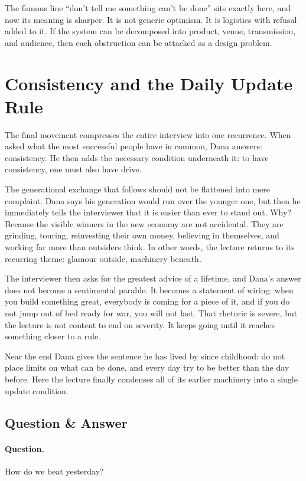 The famous line ``don't tell me something can't be done'' sits exactly here, and now its meaning is sharper. It is not generic optimism. It is logistics with refusal added to it. If the system can be decomposed into product, venue, transmission, and audience, then each obstruction can be attacked as a design problem.

\section{Consistency and the Daily Update Rule}

The final movement compresses the entire interview into one recurrence. When asked what the most successful people have in common, Dana answers: consistency. He then adds the necessary condition underneath it: to have consistency, one must also have drive.

The generational exchange that follows should not be flattened into mere complaint. Dana says his generation would run over the younger one, but then he immediately tells the interviewer that it is easier than ever to stand out. Why? Because the visible winners in the new economy are not accidental. They are grinding, touring, reinvesting their own money, believing in themselves, and working far more than outsiders think. In other words, the lecture returns to its recurring theme: glamour outside, machinery beneath.

The interviewer then asks for the greatest advice of a lifetime, and Dana's answer does not become a sentimental parable. It becomes a statement of wiring: when you build something great, everybody is coming for a piece of it, and if you do not jump out of bed ready for war, you will not last. That rhetoric is severe, but the lecture is not content to end on severity. It keeps going until it reaches something closer to a rule.

Near the end Dana gives the sentence he has lived by since childhood: do not place limits on what can be done, and every day try to be better than the day before. Here the lecture finally condenses all of its earlier machinery into a single update condition.

\subsection{Question \& Answer}

\paragraph{Question.}
How do we beat yesterday?


